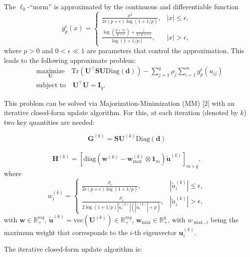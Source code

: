 \documentclass[]{article}
\begin{document}
The \(\ell_0\)-``norm'' is approximated by the continuous and
differentiable function \[g_p^{\epsilon}\left(x \right)= \begin{cases}
    \frac{x^2}{2\epsilon(p+\epsilon)\log(1+1/p)},& |x|\leq\epsilon,\\
    \frac{\log\left(\frac{p+|x|}{p+\epsilon}\right)+\frac{\epsilon}{2(p+\epsilon)}}{\log(1+1/p)},& |x|>\epsilon,
    \end{cases}\] where \(p>0\) and \(0<\epsilon\ll1\) are parameters
that control the approximation. This leads to the following approximate
problem: \[\begin{aligned}
      &\underset{\mathbf{U}}{\text{maximize}}\quad \text{Tr} \left(\mathbf{U}^\top \mathbf{S} \mathbf{U} \text{Diag}   (\mathbf{d})\right) - \sum_{j=1}^{q}\rho_j\sum_{i=1}^{m}g_p^{\epsilon}\left(u_{ij}\right)\\
    &\text{subject to}\quad \mathbf{U}^\top\mathbf{U}=\mathbf{I}_q.
  \end{aligned}\]

This problem can be solved via Majorization-Minimization (MM) {[}2{]}
with an iterative closed-form update algorithm. For this, at each
iteration (denoted by \(k\)) two key quantities are needed:

\[\mathbf{G}^{(k)} = \mathbf{S}\mathbf{U}^{(k)}\text{Diag}(\mathbf{d})\]\\
\[\mathbf{H}^{(k)}=\left[\text{diag}\left(\mathbf{w}^{(k)}-\mathbf{w}_{\max}^{(k)}\otimes\mathbf{1}_{m}\right)\mathbf{\tilde{u}}^{(k)}\right]_{m\times q},\]
where \[w_{i}^{(k)}= \begin{cases}
        \frac{\rho_i}{2\epsilon(p+\epsilon)\log(1+1/p)},& |\tilde{u}^{(k)}_{i}|\leq\epsilon,\\
        \frac{\rho_i}{2\log(1+1/p)|\tilde{u}^{(k)}_{i}|\left(|\tilde{u}^{(k)}_{i}|+p\right)},&                |\tilde{u}^{(k)}_{i}|>\epsilon,
        \end{cases}\] with \(\mathbf{w}\in\mathbb{R}_+^{mq}\),
\(\mathbf{\tilde{u}}^{(k)} = \text{vec}(\mathbf{U}^{(k)})\in\mathbb{R}_+^{mq}\),
\(\mathbf{w}_{\max}\in\mathbb{R}^q_+\), with \(w_{\max,i}\) being the
maximum weight that corresponds to the \(i\)-th eigenvector
\(\mathbf{u}^{(k)}_{i}\).

The iterative closed-form update algorithm is:
\end{document}
